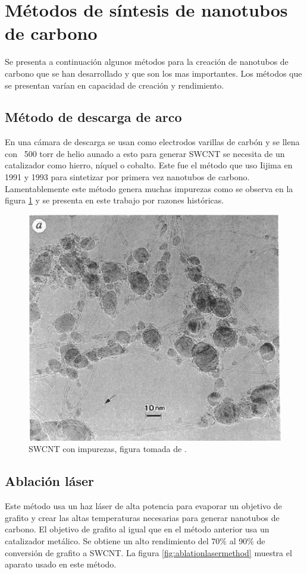 \newpage

\section{Métodos de síntesis de nanotubos de carbono}

Se presenta a continuación algunos métodos para la creación de nanotubos de carbono que se han desarrollado y que son los mas importantes. Los métodos que se presentan varían en capacidad de creación y rendimiento.

\subsection{Método de descarga de arco}

En una cámara de descarga se usan como electrodos varillas de carbón y se llena con ~500 torr de helio aunado a esto para generar SWCNT se necesita de un catalizador como hierro, níquel o cobalto. Este fue el método que uso Iijima en 1991 y 1993 para sintetizar por primera vez nanotubos de carbono. Lamentablemente este método genera muchas impurezas como se observa en la figura \ref{fig:arcmethod} y se presenta en este trabajo por razones históricas.

\begin{figure}[!h]
    \centering
    \includegraphics[width=.4\textwidth,keepaspectratio=true]{CNT/arcmethod.png}
    \caption{SWCNT con impurezas, figura tomada de \cite{Iijima1993}.}
    \label{fig:arcmethod}
\end{figure}

\newpage

\subsection{Ablación láser}

Este método usa un haz láser de alta potencia para evaporar un objetivo de grafito y crear las altas temperaturas necesarias para generar nanotubos de carbono. El objetivo de grafito al igual que en el método anterior usa un catalizador metálico. Se obtiene un alto rendimiento del 70\% al 90\% de conversión de grafito a SWCNT. La figura \ref{fig:ablationlasermethod} muestra el aparato usado en este método.

